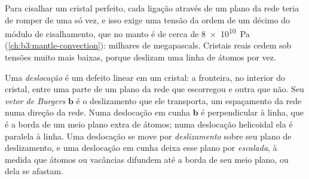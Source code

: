 Para cisalhar um cristal perfeito, cada ligação através de um plano da rede teria de
romper de uma só vez, e isso exige uma tensão da ordem de um décimo do módulo de
cisalhamento, que no manto é de cerca de \qty{8e10}{Pa}
(\cref{ch:b3:mantle-convection}): milhares de megapascals. Cristais reais cedem sob
tensões muito mais baixas, porque deslizam uma linha de átomos por vez.

\begin{definition}[Deslocação]\label{def:b3:deformation-mechanisms:dislocation}
Uma \emph{deslocação} é um defeito linear em um
cristal: a fronteira, no interior do cristal, entre uma parte de um plano da rede que
escorregou e outra que não. Seu \emph{vetor de Burgers}
$\mathbf b$ é o deslizamento que ele transporta, um espaçamento da rede numa
direção da rede. Numa deslocação em cunha $\mathbf b$ é perpendicular à linha,
que é a borda de um meio plano extra de átomos; numa deslocação helicoidal ela é
paralela à linha. Uma deslocação se move por \emph{deslizamento} sobre seu plano de
deslizamento, e uma deslocação em cunha deixa esse plano por \emph{escalada}, à medida
que átomos ou vacâncias difundem até a borda de seu meio plano, ou dela se afastam.
\end{definition}

